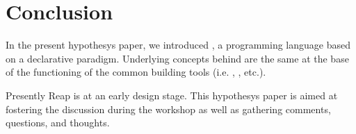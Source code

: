 \section{Conclusion}

In the present hypothesys paper, we introduced \Reap, a programming language 
based on a declarative paradigm. Underlying concepts behind \Reap are the same 
at the base of the functioning of the common building tools (i.e. , 
, etc.).  

Presently Reap is at an early design stage. This hypothesys paper
is aimed at fostering the discussion during the workshop as well as gathering 
comments, questions, and thoughts. 

% 
% 
% 
%    
% 
% 
% 
% 

